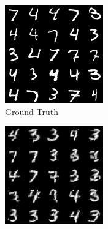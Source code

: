 \begin{figure}[H]
    \centering
    \begin{subfigure}[b]{0.24\textwidth}
        \centering
        \includegraphics[width=\textwidth]{figures/einsum/mnist/[3, 4, 7]_ground_truth.png}
        \caption{Ground Truth}
    \end{subfigure}
    \begin{subfigure}[b]{0.24\textwidth}
        \centering
        \includegraphics[width=\textwidth]{figures/einsum/mnist/[3, 4, 7]_EM.png}

\end{subfigure}
\end{figure}
